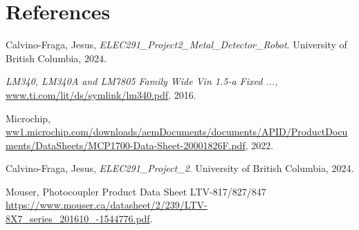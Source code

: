 \documentclass{article}
\begin{document}
\section{References}
\vspace{-2\baselineskip} %
\begin{thebibliography}{10}
     Calvino-Fraga, Jesus, \textit{ELEC291\_Project2\_Metal\_Detector\_Robot}. University of British Columbia, 2024.

     \textit{LM340, LM340A and LM7805 Family Wide Vin 1.5-a Fixed ...,} \url{www.ti.com/lit/ds/symlink/lm340.pdf}, 2016.

     Microchip, \url{ww1.microchip.com/downloads/aemDocuments/documents/APID/ProductDocuments/DataSheets/MCP1700-Data-Sheet-20001826F.pdf}, 2022.

     Calvino-Fraga, Jesus, \textit{ELEC291\_Project\_2}. University of British Columbia, 2024.

     Mouser, Photocoupler Product Data Sheet LTV-817/827/847 \url{https://www.mouser.ca/datasheet/2/239/LTV-8X7_series_201610_-1544776.pdf}.

\end{thebibliography}
\end{document}
